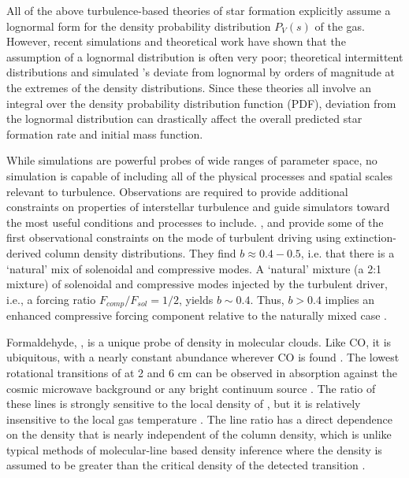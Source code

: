 All of the above turbulence-based theories of star formation explicitly assume a
lognormal form for the density probability distribution $P_V(s)$ of the gas.
However, recent simulations \citep{Federrath2013a} and theoretical work
\citep{Hopkins2013a} have shown that the assumption of a
lognormal distribution is often very poor; theoretical intermittent distributions and 
simulated \rhoPDF's deviate from lognormal by orders of magnitude
at the extremes of the density distributions.  Since these theories all involve
an integral over the density probability distribution function (PDF), deviation from
the lognormal distribution can drastically affect the overall predicted star formation
rate and initial mass function.

While simulations are powerful probes of wide ranges of parameter space, no
simulation is capable of including all of the physical processes and spatial
scales relevant to turbulence.  Observations are required to provide additional
constraints on properties of interstellar turbulence and guide simulators
toward the most useful conditions and processes to include.
\citet{Brunt2010c}, \citet{Kainulainen2012a} and \citet{Kainulainen2013a}
provide some of the first observational constraints on the mode of turbulent
driving using extinction-derived column density distributions.
They find $b\approx0.4-0.5$, i.e. that there is a `natural' mix of solenoidal
and compressive modes.  A `natural' mixture (a 2:1 mixture) of solenoidal and
compressive modes injected by the turbulent driver, i.e., a forcing ratio
$F_{comp}/F_{sol} = 1/2$, yields $b\sim0.4$. Thus, $b>0.4$ implies an enhanced
compressive forcing component relative to the naturally mixed case \citep[see
Figure 8 in][]{Federrath2010a}.


Formaldehyde, \formaldehyde, is a unique probe of density in molecular clouds.
Like CO, it is ubiquitous, with a nearly constant abundance wherever CO is
found \citep{Mangum1993a,Tang2013a}.  The lowest rotational transitions of
\ortho at 2 and 6 cm can be observed in absorption against the cosmic microwave
background or any bright continuum source \citep{Ginsburg2011a,Darling2012b}.
The ratio of these lines is strongly sensitive to the local density of \hh, but
it is relatively insensitive to the local gas temperature
\citep{Troscompt2009a,Wiesenfeld2013a}.  The \formaldehyde line ratio has a
direct dependence on the density that is nearly independent of the column
density, which is unlike typical methods of molecular-line based density
inference where the density is assumed to be greater than the critical density
of the detected transition .

